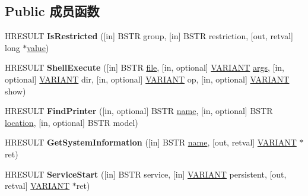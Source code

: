 \subsection*{Public 成员函数}
\begin{DoxyCompactItemize}
\item 
\mbox{\label{interface_shell32_1_1_i_shell_dispatch2_a3875ea84fcb97617f126aaf1f3107a04}} 
H\+R\+E\+S\+U\+LT {\bfseries Is\+Restricted} (\mbox{[}in\mbox{]} B\+S\+TR group, \mbox{[}in\mbox{]} B\+S\+TR restriction, \mbox{[}out, retval\mbox{]} long $\ast$\hyperlink{unionvalue}{value})
\item 
\mbox{\label{interface_shell32_1_1_i_shell_dispatch2_a6badc9b88819ef4c456f5389cde9d40b}} 
H\+R\+E\+S\+U\+LT {\bfseries Shell\+Execute} (\mbox{[}in\mbox{]} B\+S\+TR \hyperlink{structfile}{file}, \mbox{[}in, optional\mbox{]} \hyperlink{structtag_v_a_r_i_a_n_t}{V\+A\+R\+I\+A\+NT} \hyperlink{structargs}{args}, \mbox{[}in, optional\mbox{]} \hyperlink{structtag_v_a_r_i_a_n_t}{V\+A\+R\+I\+A\+NT} dir, \mbox{[}in, optional\mbox{]} \hyperlink{structtag_v_a_r_i_a_n_t}{V\+A\+R\+I\+A\+NT} op, \mbox{[}in, optional\mbox{]} \hyperlink{structtag_v_a_r_i_a_n_t}{V\+A\+R\+I\+A\+NT} show)
\item 
\mbox{\label{interface_shell32_1_1_i_shell_dispatch2_aad2b1a3a5dfc6ca6502c681e48a26d51}} 
H\+R\+E\+S\+U\+LT {\bfseries Find\+Printer} (\mbox{[}in, optional\mbox{]} B\+S\+TR \hyperlink{structname}{name}, \mbox{[}in, optional\mbox{]} B\+S\+TR \hyperlink{structlocation}{location}, \mbox{[}in, optional\mbox{]} B\+S\+TR model)
\item 
\mbox{\label{interface_shell32_1_1_i_shell_dispatch2_a58c0be344718199a99425c7c3d6aa69e}} 
H\+R\+E\+S\+U\+LT {\bfseries Get\+System\+Information} (\mbox{[}in\mbox{]} B\+S\+TR \hyperlink{structname}{name}, \mbox{[}out, retval\mbox{]} \hyperlink{structtag_v_a_r_i_a_n_t}{V\+A\+R\+I\+A\+NT} $\ast$ret)
\item 
\mbox{\label{interface_shell32_1_1_i_shell_dispatch2_a648a3c9e2530653e27393d11f273aefb}} 
H\+R\+E\+S\+U\+LT {\bfseries Service\+Start} (\mbox{[}in\mbox{]} B\+S\+TR service, \mbox{[}in\mbox{]} \hyperlink{structtag_v_a_r_i_a_n_t}{V\+A\+R\+I\+A\+NT} persistent, \mbox{[}out, retval\mbox{]} \hyperlink{structtag_v_a_r_i_a_n_t}{V\+A\+R\+I\+A\+NT} $\ast$ret)

\end{DoxyCompactItemize}
